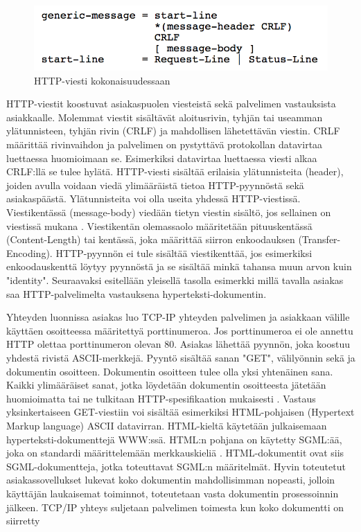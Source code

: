 \documentclass[utf8]{gradu3}
\begin{document}
\begin{figure}[h]
\centering
\includegraphics[scale=0.85]{generic_message.png}
\caption{HTTP-viesti kokonaisuudessaan \parencite{httprequest}}
\end{figure}

HTTP-viestit koostuvat asiakaspuolen viesteistä sekä palvelimen vastauksista asiakkaalle. Molemmat viestit sisältävät aloitusrivin, tyhjän tai useamman ylätunnisteen, tyhjän rivin (CRLF) ja mahdollisen lähetettävän viestin. CRLF määrittää rivinvaihdon ja palvelimen on pystyttävä protokollan datavirtaa luettaessa huomioimaan se. Esimerkiksi datavirtaa luettaessa viesti alkaa CRLF:llä se tulee hylätä. HTTP-viesti sisältää erilaisia ylätunnisteita (header), joiden avulla voidaan viedä ylimääräistä tietoa HTTP-pyynnöstä sekä asiakaspäästä. Ylätunnisteita voi olla useita yhdessä HTTP-viestissä. Viestikentässä (message-body) viedään tietyn viestin sisältö, jos sellainen on viestissä mukana \parencite{httprequest}. Viestikentän olemassaolo määritetään pituuskentässä (Content-Length) tai kentässä, joka määrittää siirron enkoodauksen (Transfer-Encoding). HTTP-pyynnön ei tule sisältää viestikenttää, jos esimerkiksi enkoodauskenttä löytyy pyynnöstä ja se sisältää minkä tahansa muun arvon kuin "identity".  Seuraavaksi esitellään yleisellä tasolla esimerkki millä tavalla asiakas saa HTTP-palvelimelta vastauksena hyperteksti-dokumentin.

Yhteyden luonnissa asiakas luo TCP-IP yhteyden palvelimen ja asiakkaan välille käyttäen osoitteessa määritettyä porttinumeroa. Jos porttinumeroa ei ole annettu HTTP olettaa porttinumeron olevan 80. Asiakas lähettää pyynnön, joka koostuu yhdestä rivistä ASCII-merkkejä. Pyyntö sisältää sanan "GET", välilyönnin sekä ja dokumentin osoitteen. Dokumentin osoitteen tulee olla yksi yhtenäinen sana. Kaikki ylimääräiset sanat, jotka löydetään dokumentin osoitteesta jätetään huomioimatta tai ne tulkitaan HTTP-spesifikaation mukaisesti \parencite{w3http2}. Vastaus yksinkertaiseen GET-viestiin voi sisältää esimerkiksi HTML-pohjaisen (Hypertext Markup language) ASCII datavirran. HTML-kieltä käytetään julkaisemaan hyperteksti-dokumenttejä WWW:ssä. HTML:n pohjana on käytetty SGML:ää, joka on standardi määrittelemään merkkauskieliä \parencite{sgml}. HTML-dokumentit ovat siis SGML-dokumentteja, jotka toteuttavat SGML:n määritelmät.  Hyvin toteutetut asiakassovellukset lukevat koko dokumentin mahdollisimman nopeasti, jolloin käyttäjän laukaisemat toiminnot, toteutetaan vasta dokumentin prosessoinnin jälkeen. TCP/IP yhteys suljetaan palvelimen toimesta kun koko dokumentti on siirretty \parencite{w3http}
\end{document}
